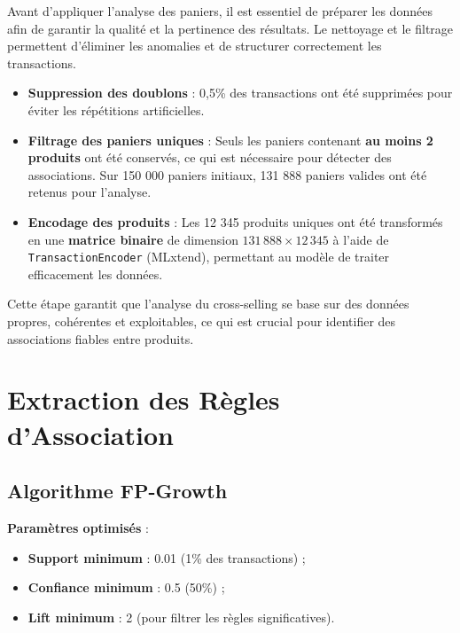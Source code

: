 \documentclass[a4paper,12pt]{article}
\begin{document}
Avant d’appliquer l’analyse des paniers, il est essentiel de préparer les données afin de garantir la qualité et la pertinence des résultats. 
Le nettoyage et le filtrage permettent d’éliminer les anomalies et de structurer correctement les transactions.  

\begin{itemize}
    \item \textbf{Suppression des doublons} : 0,5\% des transactions ont été supprimées pour éviter les répétitions artificielles.  

    \item \textbf{Filtrage des paniers uniques} :  
    Seuls les paniers contenant \textbf{au moins 2 produits} ont été conservés, ce qui est nécessaire pour détecter des associations.  
    Sur 150 000 paniers initiaux, 131 888 paniers valides ont été retenus pour l’analyse.  

    \item \textbf{Encodage des produits} :  
    Les 12 345 produits uniques ont été transformés en une \textbf{matrice binaire} de dimension $131\,888 \times 12\,345$ à l’aide de \texttt{TransactionEncoder} (MLxtend), permettant au modèle de traiter efficacement les données.  
\end{itemize}

Cette étape garantit que l’analyse du cross-selling se base sur des données propres, cohérentes et exploitables, 
ce qui est crucial pour identifier des associations fiables entre produits.

\section{Extraction des Règles d'Association}
\subsection{Algorithme FP-Growth}
\textbf{Paramètres optimisés} :

\begin{itemize}
    \item \textbf{Support minimum} : 0.01 (1\% des transactions) ;
    \item \textbf{Confiance minimum} : 0.5 (50\%) ;
    \item \textbf{Lift minimum} : 2 (pour filtrer les règles significatives).
\end{itemize}
\end{document}
